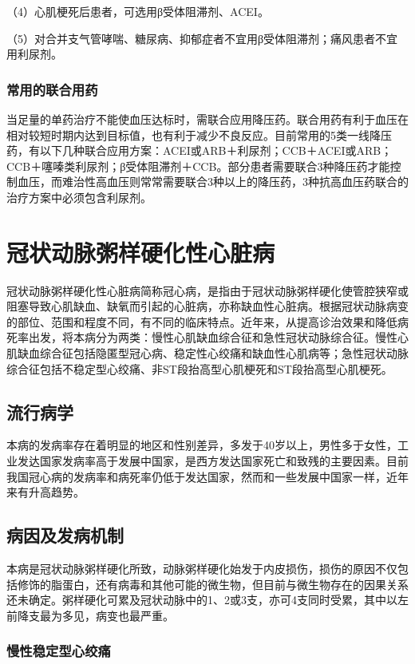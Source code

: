 （4）心肌梗死后患者，可选用β受体阻滞剂、ACEI。

（5）对合并支气管哮喘、糖尿病、抑郁症者不宜用β受体阻滞剂；痛风患者不宜用利尿剂。

\subsubsection{常用的联合用药}

当足量的单药治疗不能使血压达标时，需联合应用降压药。联合用药有利于血压在相对较短时期内达到目标值，也有利于减少不良反应。目前常用的5类一线降压药，有以下几种联合应用方案：ACEI或ARB＋利尿剂；CCB＋ACEI或ARB；CCB＋噻嗪类利尿剂；β受体阻滞剂＋CCB。部分患者需要联合3种降压药才能控制血压，而难治性高血压则常常需要联合3种以上的降压药，3种抗高血压药联合的治疗方案中必须包含利尿剂。

\section{冠状动脉粥样硬化性心脏病}

冠状动脉粥样硬化性心脏病简称冠心病，是指由于冠状动脉粥样硬化使管腔狭窄或阻塞导致心肌缺血、缺氧而引起的心脏病，亦称缺血性心脏病。根据冠状动脉病变的部位、范围和程度不同，有不同的临床特点。近年来，从提高诊治效果和降低病死率出发，将本病分为两类：慢性心肌缺血综合征和急性冠状动脉综合征。慢性心肌缺血综合征包括隐匿型冠心病、稳定性心绞痛和缺血性心肌病等；急性冠状动脉综合征包括不稳定型心绞痛、非ST段抬高型心肌梗死和ST段抬高型心肌梗死。

\subsection{流行病学}

本病的发病率存在着明显的地区和性别差异，多发于40岁以上，男性多于女性，工业发达国家发病率高于发展中国家，是西方发达国家死亡和致残的主要因素。目前我国冠心病的发病率和病死率仍低于发达国家，然而和一些发展中国家一样，近年来有升高趋势。

\subsection{病因及发病机制}

本病是冠状动脉粥样硬化所致，动脉粥样硬化始发于内皮损伤，损伤的原因不仅包括修饰的脂蛋白，还有病毒和其他可能的微生物，但目前与微生物存在的因果关系还未确定。粥样硬化可累及冠状动脉中的1、2或3支，亦可4支同时受累，其中以左前降支最为多见，病变也最严重。

\subsubsection{慢性稳定型心绞痛}


